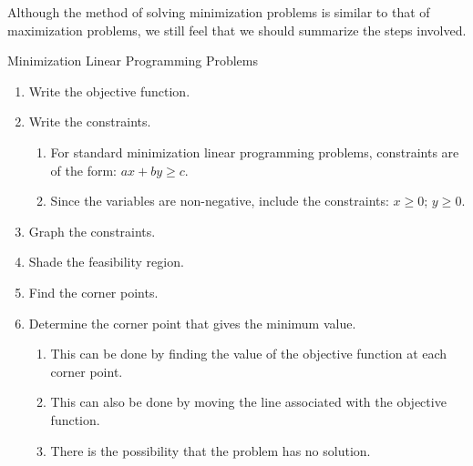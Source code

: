 Although the method of solving minimization problems is similar to that of maximization problems, we still feel that we should summarize the steps involved.
\begin{summarybox}{Minimization Linear Programming Problems}
    \begin{enumerate}
        \item Write the objective function.
        \item Write the constraints.
              \begin{enumerate}
                  \item For standard minimization linear programming problems, constraints are of the form: \(ax + by \geq c\).
                  \item Since the variables are non-negative, include the constraints: \(x \geq 0\); \(y \geq 0\).
              \end{enumerate}
        \item Graph the constraints.
        \item Shade the feasibility region.
        \item Find the corner points.
        \item Determine the corner point that gives the minimum value.
              \begin{enumerate}
                  \item This can be done by finding the value of the objective function at each corner point.
                  \item This can also be done by moving the line associated with the objective function.
                  \item There is the possibility that the problem has no solution.
              \end{enumerate}
    \end{enumerate}
\end{summarybox}
